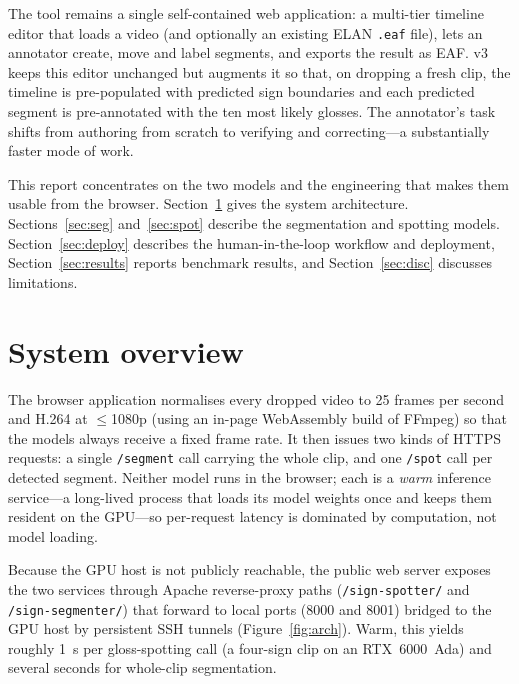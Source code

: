 \documentclass[11pt]{article}
\newcommand{\code}[1]{\texttt{\small #1}}
\begin{document}
The tool remains a single self-contained web application: a multi-tier timeline editor that
loads a video (and optionally an existing ELAN \code{.eaf} file), lets an annotator create, move
and label segments, and exports the result as EAF. v3 keeps this editor unchanged but augments
it so that, on dropping a fresh clip, the timeline is pre-populated with predicted sign
boundaries and each predicted segment is pre-annotated with the ten most likely glosses. The
annotator's task shifts from authoring from scratch to verifying and correcting---a
substantially faster mode of work.

This report concentrates on the two models and the engineering that makes them usable from the
browser. Section~\ref{sec:system} gives the system architecture. Sections~\ref{sec:seg}
and~\ref{sec:spot} describe the segmentation and spotting models. Section~\ref{sec:deploy}
describes the human-in-the-loop workflow and deployment, Section~\ref{sec:results} reports
benchmark results, and Section~\ref{sec:disc} discusses limitations.

\section{System overview}\label{sec:system}
The browser application normalises every dropped video to 25 frames per second and H.264 at
$\leq$1080p (using an in-page WebAssembly build of FFmpeg) so that the models always receive a
fixed frame rate. It then issues two kinds of HTTPS requests: a single \code{/segment} call
carrying the whole clip, and one \code{/spot} call per detected segment. Neither model runs in
the browser; each is a \emph{warm} inference service---a long-lived process that loads its model
weights once and keeps them resident on the GPU---so per-request latency is dominated by
computation, not model loading.

Because the GPU host is not publicly reachable, the public web server exposes the two services
through Apache reverse-proxy paths (\code{/sign-spotter/} and \code{/sign-segmenter/}) that
forward to local ports (8000 and 8001) bridged to the GPU host by persistent SSH tunnels
(Figure~\ref{fig:arch}). Warm, this yields roughly 1~s per gloss-spotting call (a four-sign clip
on an RTX~6000~Ada) and several seconds for whole-clip segmentation.
\end{document}
